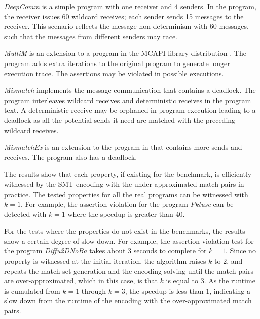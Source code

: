 \begin{compactitem}
\item \textit{DeepComm} is a simple program with one receiver and 4 senders. In the program, the receiver issues 60 wildcard receives; each sender sends 15 messages to the receiver.
This scenario reflects the message non-determinism with 60 messages, such that the messages from different senders may race.

\item \textit{MultiM} is an extension to a program in the MCAPI library distribution \cite{DBLP:conf/kbse/HuangMM13}. The program adds extra iterations to the original program to generate longer execution trace. The assertions may be violated in possible executions.

\item \textit{Mismatch} implements the message communication that contains a deadlock. The program interleaves wildcard receives and deterministic receives in the program text. A deterministic receive may be orphaned in program execution leading to a deadlock as all the potential sends it need are matched with the preceding wildcard receives. 

\item \textit{MismatchEx} is an extension to the program in  that contains more sends and receives. The program also has a deadlock. 
\end{compactitem}


The results show that each property, if existing for the benchmark, is efficiently witnessed by the SMT encoding with the under-approximated match pairs in practice. The tested properties for all the real programs can be witnessed with $k=1$. 
For example, the assertion violation for the program \textit{Pktuse} can be detected with $k=1$ where the speedup is greater than 40.

For the tests where the properties do not exist in the benchmarks, the results show a certain degree of slow down. For example, the assertion violation test for the program \textit{Diffu2DNoBa} takes about 3 seconds to complete for $k=1$. Since no property is witnessed at the initial iteration, the algorithm raises $k$ to $2$, and repeats the match set generation and the encoding solving until the match pairs are over-approximated, which in this case, is that $k$ is equal to $3$. As the runtime is cumulated from $k=1$ through $k=3$, the speedup is less than $1$, indicating a slow down from the runtime of the encoding with the over-approximated match pairs.

